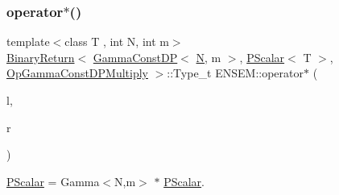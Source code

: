 \subsubsection{\texorpdfstring{operator$\ast$()}{operator*()}\hspace{0.1cm}{\footnotesize\ttfamily [4/5]}}
{\footnotesize\ttfamily template$<$class T , int N, int m$>$ \\
\mbox{\hyperlink{structENSEM_1_1BinaryReturn}{Binary\+Return}}$<$ \mbox{\hyperlink{classENSEM_1_1GammaConstDP}{Gamma\+Const\+DP}}$<$ \mbox{\hyperlink{adat__devel_2lib_2hadron_2operator__name__util_8cc_a7722c8ecbb62d99aee7ce68b1752f337}{N}}, m $>$, \mbox{\hyperlink{classENSEM_1_1PScalar}{P\+Scalar}}$<$ T $>$, \mbox{\hyperlink{structENSEM_1_1OpGammaConstDPMultiply}{Op\+Gamma\+Const\+D\+P\+Multiply}} $>$\+::Type\+\_\+t E\+N\+S\+E\+M\+::operator$\ast$ (\begin{DoxyParamCaption}\item[{const \mbox{\hyperlink{classENSEM_1_1GammaConstDP}{Gamma\+Const\+DP}}$<$ \mbox{\hyperlink{adat__devel_2lib_2hadron_2operator__name__util_8cc_a7722c8ecbb62d99aee7ce68b1752f337}{N}}, m $>$ \&}]{l,  }\item[{const \mbox{\hyperlink{classENSEM_1_1PScalar}{P\+Scalar}}$<$ T $>$ \&}]{r }\end{DoxyParamCaption})\hspace{0.3cm}{\ttfamily [inline]}}



\mbox{\hyperlink{classENSEM_1_1PScalar}{P\+Scalar}} = Gamma$<$\+N,m$>$ $\ast$ \mbox{\hyperlink{classENSEM_1_1PScalar}{P\+Scalar}}. 

\mbox{\label{group__primscalar_ga97e70139990daa175326a04636431dbd}} 
